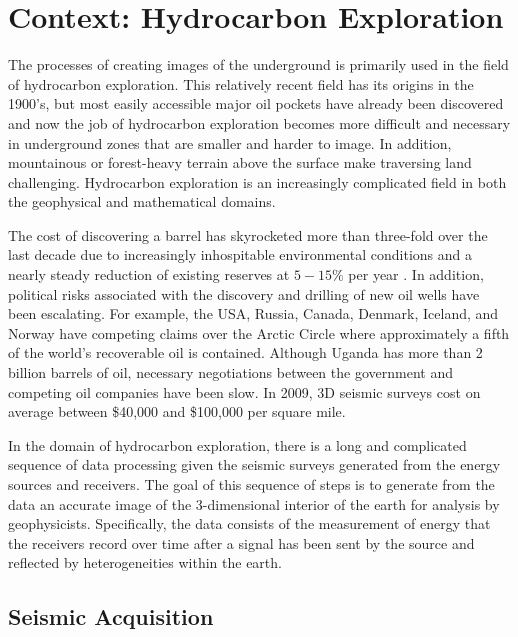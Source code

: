 \newpage
\section{Context: Hydrocarbon Exploration}

The processes of creating images of the underground is primarily used in the field of hydrocarbon exploration. This relatively recent field has its origins in the 1900's, but most easily accessible major oil pockets have already been discovered and now the job of hydrocarbon exploration becomes more difficult and necessary in underground zones that are smaller and harder to image. In addition, mountainous or forest-heavy terrain above the surface make traversing land challenging. Hydrocarbon exploration is an increasingly complicated field in both the geophysical and mathematical domains. 

The cost of discovering a barrel has skyrocketed more than three-fold over the last decade due to increasingly inhospitable environmental conditions and a nearly steady reduction of existing reserves at $5-15\%$ per year \cite{hydrocarbonExplorationCosts}. In addition, political risks associated with the discovery and drilling of new oil wells have been escalating. For example, the USA, Russia, Canada, Denmark, Iceland, and Norway have competing claims over the Arctic Circle where approximately a fifth of the world's recoverable oil is contained. Although Uganda has more than 2 billion barrels of oil, necessary negotiations between the government and competing oil companies have been slow. In 2009, 3D seismic surveys cost on average between \$40,000 and \$100,000 per square mile. \cite{hydrocarbonExplorationCosts}

In the domain of hydrocarbon exploration, there is a long and complicated sequence of data processing given the seismic surveys generated from the energy sources and receivers. The goal of this sequence of steps is to generate from the data an accurate image of the 3-dimensional interior of the earth for analysis by geophysicists. Specifically, the data consists of the measurement of energy that the receivers record over time after a signal has been sent by the source and reflected by heterogeneities within the earth.

\subsection{Seismic Acquisition}

